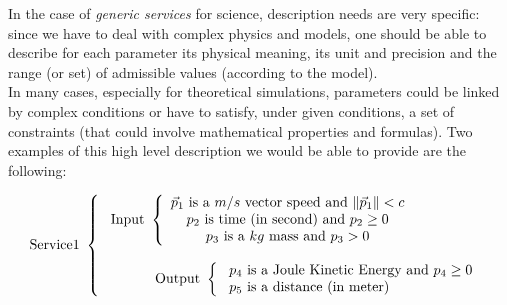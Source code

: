 \documentclass[a4paper,11pt] {ivoa}
\begin{document}
In the case of {\it generic services} for science, description needs are very specific: since we
have to deal with complex physics and models, one should be able to describe for each parameter its
physical meaning, its unit and precision and the range (or set) of admissible values (according to
the model).\\ 

In many cases, especially for theoretical simulations, parameters could be linked by
complex conditions or have to satisfy, under given conditions, a set of constraints (that could
involve mathematical properties and formulas).
Two examples of this high level description we would be able to provide are the following:

\begin{equation}\label{PDLExemplum01}
\mbox{Service1 }\left\{
\begin{array}{l}
\ \mbox{Input } \left\{
\begin{array}{c}
 \mbox{$\vec p_1$ is a $m/s$ vector speed and $\| \vec p_1\|<c$} \\
 \mbox{ $p_2$ is time (in second) and $p_2 \geq 0$ }\\
 \mbox{$p_3$ is a $kg$ mass and $p_3 > 0$}\\
\end{array}
\right. \\
\\
\ \mbox{\hspace{1cm} Output } \left\{
\begin{array}{l}
 \mbox{ $p_4$ is a Joule Kinetic Energy and $p_4 \geq 0$} \\
 \mbox{ $p_5$ is a distance (in meter) }\\
 \end{array}
\right.\\
\end{array}
\right.
\end{equation}
\end{document}
